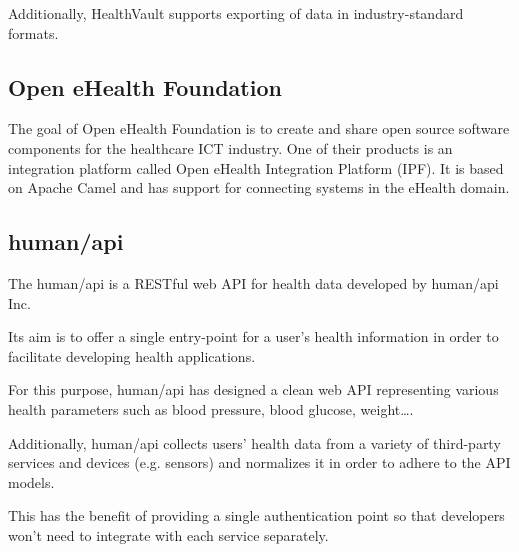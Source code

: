 
Additionally, HealthVault supports exporting of data in industry-standard formats.



\subsection{Open eHealth Foundation} \nocite{OpenEHealthFoundation}

The goal of Open eHealth Foundation is to create and share open source software components for the healthcare ICT industry.
One of their products is an integration platform called Open eHealth Integration Platform (IPF).
It is based on Apache Camel and has support for connecting systems in the eHealth domain.

\subsection{human/api} \nocite{HumanAPI}

The human/api is a RESTful web API for health data developed by human/api Inc.

Its aim is to offer a single entry-point for a user's health information
in order to facilitate developing health applications.

For this purpose, human/api has designed a clean web API representing various health
parameters such as blood pressure, blood glucose, weight\ldots.

Additionally, human/api collects users' health data from a variety of third-party
services and devices (e.g. sensors) and normalizes it in order to adhere to the API models.


This has the benefit of providing a single authentication point so that developers won't
need to integrate with each service separately.

